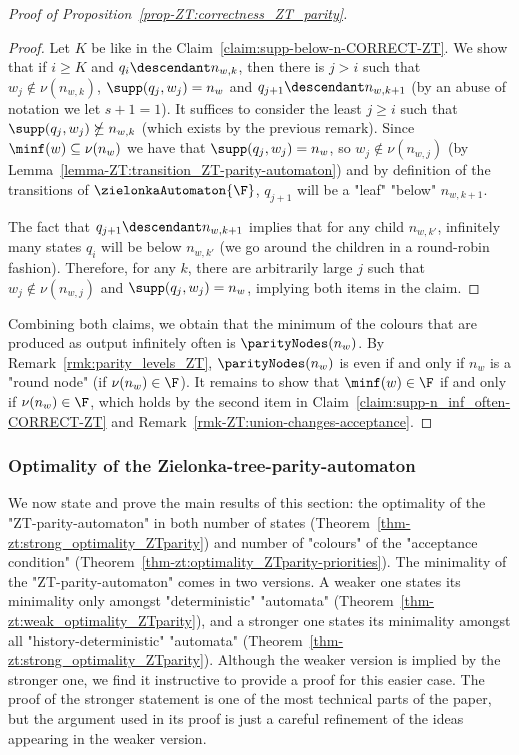 \documentclass[10pt,a4paper]{amsart}
\newenvironment{subproof}[1][Proof]{\begin{proof}[#1]\renewcommand{\qedsymbol}{$\blacksquare$}}{\end{proof}}
\begin{document}
\begin{proof}[Proof of Proposition~\ref{prop-ZT:correctness_ZT_parity}]
\begin{subproof}
		Let $K$ be like in the Claim~\ref{claim:supp-below-n-CORRECT-ZT}.
		We show that if $i\geq K$ and $q_i\descendant n_{w,k}$, then there is $j> i$ such that $w_j\notin \nu(n_{w,k})$, $\supp(q_{j},w_{j}) = n_{w}$ and $q_{j+1}\descendant n_{w,k+1}$ (by an abuse of notation we let $s+1 = 1$). 
	    It suffices to consider the least $j \geq i$ such that $\supp(q_{j},w_{j})\nsucceq n_{w,k}$ (which exists by the previous remark). Since $\minf(w)\subseteq \nu(n_w)$ we have that $\supp(q_{j},w_{j}) = n_{w}$, so $w_j\notin \nu(n_{w,j})$ (by Lemma~\ref{lemma-ZT:transition_ZT-parity-automaton}) and by definition of the transitions of $\zielonkaAutomaton{\F}$, $q_{j+1}$ will be a "leaf" "below" $n_{w,k+1}$.
	    
	    The fact that $q_{j+1}\descendant n_{w,k+1}$ implies that for any child $n_{w,k'}$, infinitely many states $q_i$ will be below $n_{w,k'}$ (we go around the children in a round-robin fashion). Therefore, for any $k$, there are arbitrarily large $j$ such that $w_j\notin \nu(n_{w,j})$ and $\supp(q_{j},w_{j}) = n_{w}$, implying both items in the claim.
	\end{subproof}
	Combining both claims, we obtain that the minimum of the colours that are produced as output infinitely often is $\parityNodes(n_w)$. By Remark~\ref{rmk:parity_levels_ZT}, $\parityNodes(n_w)$ is even if and only if $n_w$ is a "round node" (if $\nu(n_w)\in \F$). It remains to show that $\minf(w) \in \F$ if and only if $\nu(n_w)\in \F$, which holds by the second item in Claim~\ref{claim:supp-n_inf_often-CORRECT-ZT} and Remark~\ref{rmk-ZT:union-changes-acceptance}.	
\end{proof}


\subsubsection{Optimality of the Zielonka-tree-parity-automaton}\label{subsubsec-zt-parity: optimality}
We now state and prove the main results of this section: the optimality of the "ZT-parity-automaton" in both number of states (Theorem~\ref{thm-zt:strong_optimality_ZTparity}) and number of "colours" of the "acceptance condition" (Theorem~\ref{thm-zt:optimality_ZTparity-priorities}).
The minimality of the "ZT-parity-automaton" comes in two versions. A weaker one states its minimality only amongst "deterministic" "automata" (Theorem~\ref{thm-zt:weak_optimality_ZTparity}), and a stronger one states its minimality amongst all "history-deterministic"  "automata" (Theorem~\ref{thm-zt:strong_optimality_ZTparity}). Although the weaker version is implied by the stronger one, we find it instructive to provide a proof for this easier case. The proof of the stronger statement is one of the most technical parts of the paper, but the argument used in its proof is just a careful refinement of the ideas appearing in the weaker version.
\end{document}
